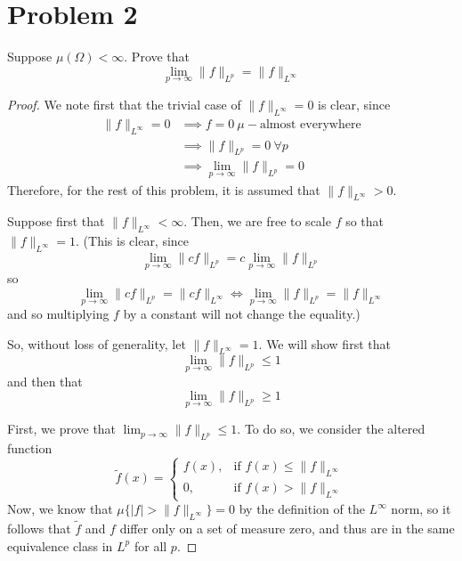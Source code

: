 \documentclass[fontsize=11pt]{scrartcl} %
\numberwithin{equation}{section} %
\numberwithin{figure}{section} %
\numberwithin{table}{section} %
\begin{document}
\newpage

\section*{Problem 2}
Suppose $\mu(\Omega)<\infty$. Prove that
\[
    \lim_{p\to\infty} \|f\|_{L^p} = \|f\|_{L^{\infty}}
\]

\begin{proof}
    We note first that the trivial case of $\|f\|_{L^{\infty}} = 0$ is clear,
    since 
    \[
        \begin {aligned}
        \|f\|_{L^{\infty}}=0 &\implies f = 0\ \mu-\textrm{almost everywhere}\\
                            &\implies \|f\|_{L^p}=0\ \forall p\\
                            &\implies \lim_{p\to\infty}\|f\|_{L^p} = 0
\end{aligned}
    \]
    Therefore, for the rest of this problem, it is assumed that
    $\|f\|_{L^{\infty}}>0$.


    Suppose first that $\|f\|_{L^{\infty}} < \infty$. Then, we are free to scale
    $f$ so that $\|f\|_{L^{\infty}}=1$. (This is clear, since
    \[
        \lim_{p\to\infty}\|cf\|_{L^p} = c\lim_{p\to\infty}\|f\|_{L^p}
    \]
    so
    \[
        \lim_{p\to\infty}\|cf\|_{L^p} = \|cf\|_{L^{\infty}}
        \iff
        \lim_{p\to\infty}\|f\|_{L^p} = \|f\|_{L^{\infty}}
    \]
    and so multiplying $f$ by a constant will not change the equality.)

    So, without loss of generality, let $\|f\|_{L^{\infty}} = 1$.
    We will show first that
    \[
        \lim_{p\to\infty}\|f\|_{L^p} \leq 1
    \]
    and then that
    \[
        \lim_{p\to\infty}\|f\|_{L^p} \geq 1
    \]

    First, we prove that $\lim_{p\to\infty}\|f\|_{L^p} \leq 1$. To do so, we
    consider the altered function
    \[
        \tilde{f}(x) = \begin{cases}
            f(x), &\textrm{if } f(x) \leq \|f\|_{L^\infty}\\
            0, &\textrm{if } f(x) > \|f\|_{L^\infty}
        \end{cases}
    \]
    Now, we know that $\mu\{|f| > \|f\|_{L^{\infty}}\} = 0$ by the definition of
    the $L^{\infty}$ norm, so it follows that $\tilde{f}$ and $f$ differ only on
    a set of measure zero, and thus are in the same equivalence class in $L^p$
    for all $p$.


\end{proof}
\end{document}
